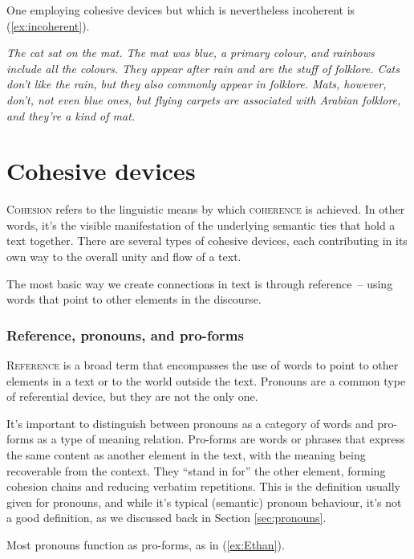 \noindent One employing cohesive devices but which is nevertheless incoherent is (\ref{ex:incoherent}).

\ea \label{ex:incoherent}
\textit{The cat sat on the mat. The mat was blue, a primary colour, and rainbows include all the colours. They appear after rain and are the stuff of folklore. Cats don't like the rain, but they also commonly appear in folklore. Mats, however, don't, not even blue ones, but flying carpets are associated with Arabian folklore, and they're a kind of mat.}
\z

\section{Cohesive devices}

\textsc{Cohesion} refers to the linguistic means by which \textsc{coherence} is achieved. In other words, it's the visible manifestation of the underlying semantic ties that hold a text together. There are several types of cohesive devices, each contributing in its own way to the overall unity and flow of a text.

The most basic way we create connections in text is through reference~-- using words that point to other elements in the discourse.

\subsubsection*{Reference, pronouns, and pro-forms}

\textsc{Reference} is a broad term that encompasses the use of words to point to other elements in a text or to the world outside the text. Pronouns are a common type of referential device, but they are not the only one.

It's important to distinguish between pronouns as a category of words and pro-forms as a type of meaning relation. Pro-forms are words or phrases that express the same content as another element in the text, with the meaning being recoverable from the context. They ``stand in for'' the other element, forming cohesion chains and reducing verbatim repetitions. This is the definition usually given for pronouns, and while it's typical (semantic) pronoun behaviour, it's not a good definition, as we discussed back in Section \ref{sec:pronouns}.

Most pronouns function as pro-forms, as in (\ref{ex:Ethan}).

 \label{ex:Ethan}
\z

